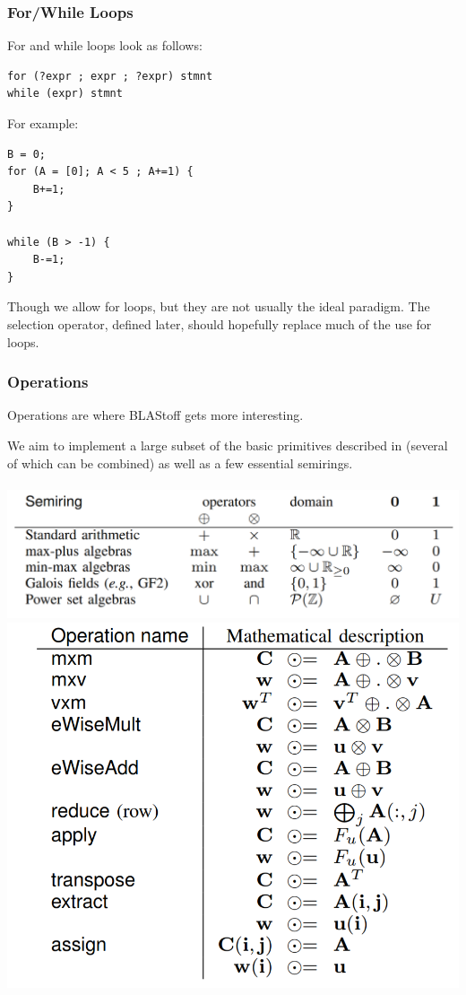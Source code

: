 \subsubsection{For/While Loops}
For and while loops look as follows:
\begin{lstlisting}
for (?expr ; expr ; ?expr) stmnt
while (expr) stmnt
\end{lstlisting}

For example:

\begin{lstlisting}
B = 0;
for (A = [0]; A < 5 ; A+=1) {
    B+=1;
}

while (B > -1) {
    B-=1;
}
\end{lstlisting}
Though we allow for loops, but they are not usually the ideal paradigm.  The selection operator, defined later,  should hopefully replace much of the use for loops.

\subsubsection{Operations}
Operations are where BLAStoff gets more interesting.

We aim to implement a large subset of the basic primitives described in \cite{Gilbert} (several of which can be combined) as well as a few essential semirings.\\\\
\label{sec:semirings}
\includegraphics[scale=0.3]{figures/semirings}\\
\includegraphics[scale=0.3]{figures/primitives}\\


